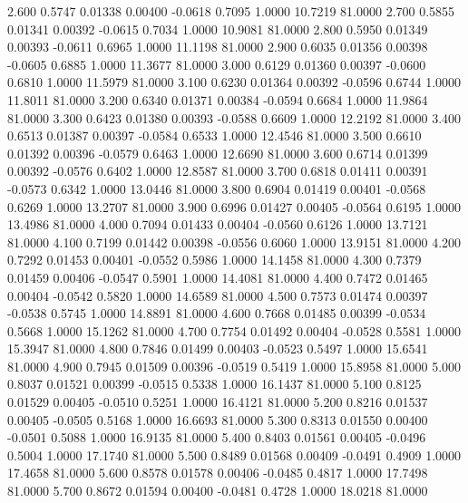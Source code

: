    2.600   0.5747   0.01338   0.00400  -0.0618   0.7095   1.0000  10.7219  81.0000
   2.700   0.5855   0.01341   0.00392  -0.0615   0.7034   1.0000  10.9081  81.0000
   2.800   0.5950   0.01349   0.00393  -0.0611   0.6965   1.0000  11.1198  81.0000
   2.900   0.6035   0.01356   0.00398  -0.0605   0.6885   1.0000  11.3677  81.0000
   3.000   0.6129   0.01360   0.00397  -0.0600   0.6810   1.0000  11.5979  81.0000
   3.100   0.6230   0.01364   0.00392  -0.0596   0.6744   1.0000  11.8011  81.0000
   3.200   0.6340   0.01371   0.00384  -0.0594   0.6684   1.0000  11.9864  81.0000
   3.300   0.6423   0.01380   0.00393  -0.0588   0.6609   1.0000  12.2192  81.0000
   3.400   0.6513   0.01387   0.00397  -0.0584   0.6533   1.0000  12.4546  81.0000
   3.500   0.6610   0.01392   0.00396  -0.0579   0.6463   1.0000  12.6690  81.0000
   3.600   0.6714   0.01399   0.00392  -0.0576   0.6402   1.0000  12.8587  81.0000
   3.700   0.6818   0.01411   0.00391  -0.0573   0.6342   1.0000  13.0446  81.0000
   3.800   0.6904   0.01419   0.00401  -0.0568   0.6269   1.0000  13.2707  81.0000
   3.900   0.6996   0.01427   0.00405  -0.0564   0.6195   1.0000  13.4986  81.0000
   4.000   0.7094   0.01433   0.00404  -0.0560   0.6126   1.0000  13.7121  81.0000
   4.100   0.7199   0.01442   0.00398  -0.0556   0.6060   1.0000  13.9151  81.0000
   4.200   0.7292   0.01453   0.00401  -0.0552   0.5986   1.0000  14.1458  81.0000
   4.300   0.7379   0.01459   0.00406  -0.0547   0.5901   1.0000  14.4081  81.0000
   4.400   0.7472   0.01465   0.00404  -0.0542   0.5820   1.0000  14.6589  81.0000
   4.500   0.7573   0.01474   0.00397  -0.0538   0.5745   1.0000  14.8891  81.0000
   4.600   0.7668   0.01485   0.00399  -0.0534   0.5668   1.0000  15.1262  81.0000
   4.700   0.7754   0.01492   0.00404  -0.0528   0.5581   1.0000  15.3947  81.0000
   4.800   0.7846   0.01499   0.00403  -0.0523   0.5497   1.0000  15.6541  81.0000
   4.900   0.7945   0.01509   0.00396  -0.0519   0.5419   1.0000  15.8958  81.0000
   5.000   0.8037   0.01521   0.00399  -0.0515   0.5338   1.0000  16.1437  81.0000
   5.100   0.8125   0.01529   0.00405  -0.0510   0.5251   1.0000  16.4121  81.0000
   5.200   0.8216   0.01537   0.00405  -0.0505   0.5168   1.0000  16.6693  81.0000
   5.300   0.8313   0.01550   0.00400  -0.0501   0.5088   1.0000  16.9135  81.0000
   5.400   0.8403   0.01561   0.00405  -0.0496   0.5004   1.0000  17.1740  81.0000
   5.500   0.8489   0.01568   0.00409  -0.0491   0.4909   1.0000  17.4658  81.0000
   5.600   0.8578   0.01578   0.00406  -0.0485   0.4817   1.0000  17.7498  81.0000
   5.700   0.8672   0.01594   0.00400  -0.0481   0.4728   1.0000  18.0218  81.0000
